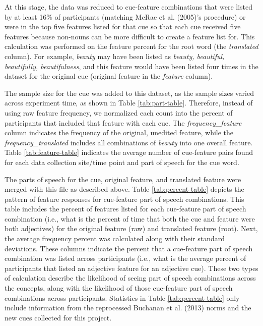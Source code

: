 \documentclass[english,,man]{apa6}
\begin{document}
At this stage, the data was reduced to cue-feature combinations that were listed by at least 16\% of participants (matching McRae et al. (2005)'s procedure) or were in the top five features listed for that cue so that each cue received five features because non-nouns can be more difficult to create a feature list for. This calculation was performed on the feature percent for the root word (the \emph{translated} column). For example, \emph{beauty} may have been listed as \emph{beauty, beautiful, beautifully, beautifulness}, and this feature would have been listed four times in the dataset for the original cue (original feature in the \emph{feature} column).

The sample size for the cue was added to this dataset, as the sample sizes varied across experiment time, as shown in Table \ref{tab:part-table}. Therefore, instead of using raw feature frequency, we normalized each count into the percent of participants that included that feature with each cue. The \emph{frequency\_feature} column indicates the frequency of the original, unedited feature, while the \emph{frequency\_translated} includes all combinations of \emph{beauty} into one overall feature. Table \ref{tab:feature-table} indicates the average number of cue-feature pairs found for each data collection site/time point and part of speech for the cue word.

The parts of speech for the cue, original feature, and translated feature were merged with this file as described above. Table \ref{tab:percent-table} depicts the pattern of feature responses for cue-feature part of speech combinations. This table includes the percent of features listed for each cue-feature part of speech combination (i.e., what is the percent of time that both the cue and feature were both adjectives) for the original feature (raw) and translated feature (root). Next, the average frequency percent was calculated along with their standard deviations. These columns indicate the percent that a cue-feature part of speech combination was listed across participants (i.e., what is the average percent of participants that listed an adjective feature for an adjective cue). These two types of calculation describe the likelihood of seeing part of speech combinations across the concepts, along with the likelihood of those cue-feature part of speech combinations across participants. Statistics in Table \ref{tab:percent-table} only include information from the reprocessed Buchanan et al. (2013) norms and the new cues collected for this project.
\end{document}
